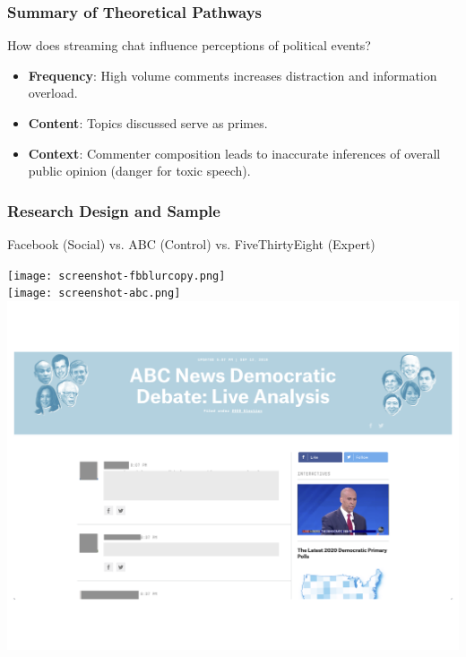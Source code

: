 \documentclass{beamer}
\begin{document}
\begin{frame}
\frametitle{Summary of Theoretical Pathways}

How does streaming chat influence perceptions of political events?

\begin{itemize}
    \item \textbf{Frequency}: High volume comments increases distraction and information overload. 
    \item \textbf{Content}: Topics discussed serve as primes.
    \item \textbf{Context}: Commenter composition leads to inaccurate inferences of overall public opinion (danger for toxic speech).
\end{itemize}

\end{frame}


\begin{frame}
\frametitle{Research Design and Sample}

Facebook (Social) vs. ABC (Control) vs. FiveThirtyEight (Expert)

\centering
\texttt{[image: screenshot-fbblurcopy.png]}\\
\texttt{[image: screenshot-abc.png]}
\includegraphics[width=.35\linewidth]{screenshot-538-blurcopy.png}\\

\end{frame}
\end{document}
